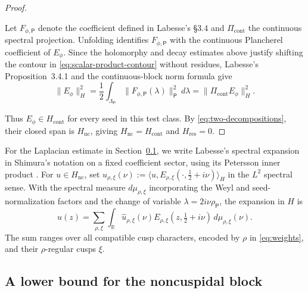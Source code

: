 \documentclass[11pt]{article}
\theoremstyle{definition}
\theoremstyle{plain}
\numberwithin{equation}{section}
\newcommand{\nc}{\mathrm{nc}}
\newcommand{\res}{\mathrm{res}}
\newcommand{\cont}{\mathrm{cont}}
\begin{document}
\begin{proof}
\begin{samepage}
Let $F_{\phi,\mathsf P}$ denote the coefficient defined in Labesse's
\S3.4 and $\Pi_{\cont}$ the continuous spectral projection. Unfolding
\cite[Lem.~2.4.1]{Labesse} identifies $F_{\phi,\mathsf P}$ with the
continuous Plancherel coefficient of $E_\phi$. Since the holomorphy and
decay estimates above justify shifting the contour in
\eqref{eq:scalar-product-contour} without residues, Labesse's
Proposition~3.4.1 \cite{Labesse} and the continuous-block norm formula
\cite[Thm.~2.10.3]{Labesse} give
\begin{equation}\label{eq:no-residue-norm}
 \|E_\phi\|_H^2
 =\frac12\int_{\Lambda_{\mathsf P}}
   \|F_{\phi,\mathsf P}(\lambda)\|_{\mathsf P}^2\,d\lambda
 =\|\Pi_{\cont}E_\phi\|_H^2.
\end{equation}
\end{samepage}

Thus $E_\phi\in H_{\cont}$ for every seed in this test class. By
\eqref{eq:two-decompositions}, their closed span is $H_{\nc}$, giving
$H_{\nc}=H_{\cont}$ and $H_{\res}=0$.
\end{proof}

For the Laplacian estimate in Section~\ref{subsec:invertibility}, we write Labesse's spectral
expansion \cite[Thm.~2.10.4(ii)--(iii) and footnote~5]{Labesse} in
Shimura's notation on a fixed coefficient sector, using its Petersson
inner product \cite[(2.9)]{Shimura}. For $u\in H_{\nc}$, set
$\widehat u_{\rho,\xi}(\nu):=
\langle u,E_{\rho,\xi}(\cdot,\tfrac12+i\nu)\rangle_H$
in the $L^2$ spectral sense. With the spectral measure $d\mu_{\rho,\xi}$ incorporating the
Weyl and seed-normalization factors and the change of variable
$\lambda=2i\nu\rho_{\mathsf P}$, the expansion in $H$ is
\begin{equation}\label{eq:shimura-expansion}
 u(z)=\sum_{\rho,\xi}\int_{\mathbb R}
 \widehat u_{\rho,\xi}(\nu)
 E_{\rho,\xi}\left(z,\tfrac12+i\nu\right)
 \,d\mu_{\rho,\xi}(\nu).
\end{equation}
The sum ranges over all compatible cusp characters, encoded by $\rho$
in \eqref{eq:weights}, and their $\rho$-regular cusps $\xi$.

\subsection{A lower bound for the noncuspidal block}
\label{subsec:invertibility}
\end{document}
